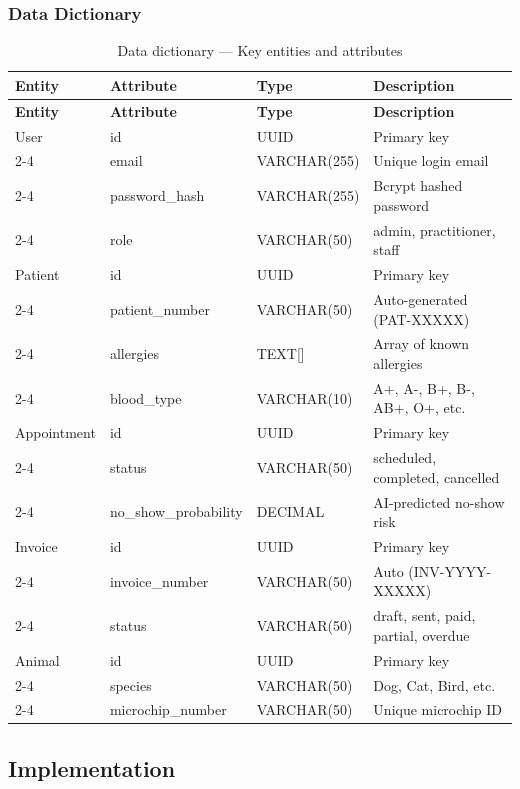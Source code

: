 \documentclass[12pt,a4paper,oneside]{report}
\begin{document}
\subsubsection{Data Dictionary}

\begin{longtable}{|p{3cm}|p{3cm}|p{2.5cm}|p{4.5cm}|}
\caption{Data dictionary — Key entities and attributes} \label{tab:data_dict} \\
\hline
\textbf{Entity} & \textbf{Attribute} & \textbf{Type} & \textbf{Description} \\
\hline
\endfirsthead
\hline
\textbf{Entity} & \textbf{Attribute} & \textbf{Type} & \textbf{Description} \\
\hline
\endhead
User & id & UUID & Primary key \\
\cline{2-4}
 & email & VARCHAR(255) & Unique login email \\
\cline{2-4}
 & password\_hash & VARCHAR(255) & Bcrypt hashed password \\
\cline{2-4}
 & role & VARCHAR(50) & admin, practitioner, staff \\
\hline
Patient & id & UUID & Primary key \\
\cline{2-4}
 & patient\_number & VARCHAR(50) & Auto-generated (PAT-XXXXX) \\
\cline{2-4}
 & allergies & TEXT[] & Array of known allergies \\
\cline{2-4}
 & blood\_type & VARCHAR(10) & A+, A-, B+, B-, AB+, O+, etc. \\
\hline
Appointment & id & UUID & Primary key \\
\cline{2-4}
 & status & VARCHAR(50) & scheduled, completed, cancelled \\
\cline{2-4}
 & no\_show\_probability & DECIMAL & AI-predicted no-show risk \\
\hline
Invoice & id & UUID & Primary key \\
\cline{2-4}
 & invoice\_number & VARCHAR(50) & Auto (INV-YYYY-XXXXX) \\
\cline{2-4}
 & status & VARCHAR(50) & draft, sent, paid, partial, overdue \\
\hline
Animal & id & UUID & Primary key \\
\cline{2-4}
 & species & VARCHAR(50) & Dog, Cat, Bird, etc. \\
\cline{2-4}
 & microchip\_number & VARCHAR(50) & Unique microchip ID \\
\hline
\end{longtable}

\subsection{Implementation}
\end{document}
